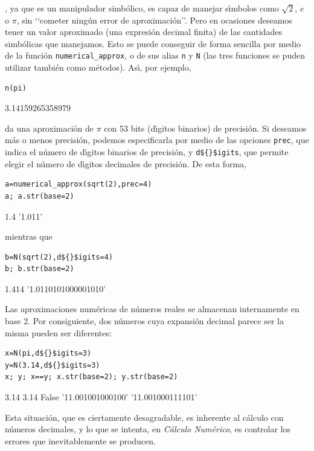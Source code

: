 
{\sage}, ya que es un  manipulador simb\'olico, es capaz de manejar
s\'{\i}mbolos
como $\sqrt{2}$, $e$ o $\pi$, sin \lq\lq cometer ning\'un error de
aproximaci\'on\rq\rq. Pero en ocasiones deseamos tener un valor aproximado (una
expresi\'on decimal finita) de las cantidades simb\'olicas que manejamos. Esto
se puede conseguir de forma sencilla por medio de la funci\'on
\lstinline|numerical_approx|, o de sus alias \lstinline|n| y \lstinline|N| (las
tres funciones se puden utilizar tambi\'en como m\'etodos). As\'{\i}, por
ejemplo,
\begin{lstlisting}
n(pi)
\end{lstlisting}
\begin{Output}
    3.14159265358979
\end{Output}
da una aproximaci\'on de $\pi$ con 53 bits (d\'{\i}gitos binarios) de
precisi\'on. Si deseamos m\'as o menos precisi\'on, podemos especificarla por
medio de las opciones  \lstinline|prec|, que indica el n\'umero de d\'{\i}gitos
binarios de precisi\'on, y \lstinline|d${}$igits|, que permite elegir el
n\'umero de
d\'{\i}gitos decimales de precisi\'on. De esta forma,
\begin{lstlisting}
a=numerical_approx(sqrt(2),prec=4)
a; a.str(base=2)
\end{lstlisting}
\begin{Output}
    1.4
    '1.011'
\end{Output}
mientras que
\begin{lstlisting}
b=N(sqrt(2),d${}$igits=4)
b; b.str(base=2)
\end{lstlisting}
\begin{Output}
    1.414
    '1.0110101000001010'
\end{Output}

Las aproximaciones num\'ericas de n\'umeros reales se almacenan internamente en
base 2. Por consiguiente, dos n\'umeros cuya expansi\'on decimal parece ser la
misma pueden ser diferentes:
\begin{lstlisting}
x=N(pi,d${}$igits=3)
y=N(3.14,d${}$igits=3)
x; y; x==y; x.str(base=2); y.str(base=2)
\end{lstlisting}
\begin{Output}
    3.14
    3.14
    False
    '11.001001000100'
    '11.001000111101'
\end{Output}

Esta situaci\'on, que es ciertamente desagradable, es inherente al c\'alculo
con n\'umeros decimales, y lo que se intenta, en {\itshape C\'alculo
Num\'erico},  es controlar los errores que
inevitablemente se producen. 

